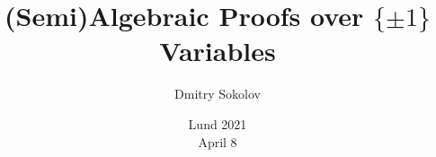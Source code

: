 

\titlegraphic{
    
}


\title[$\{\pm 1\}$ Variables]{
    (Semi)Algebraic Proofs over $\{\pm 1\}$ Variables
}

\author[Sokolov D.]{
    Dmitry Sokolov
}  


\date{Lund 2021\\ April 8}

\newcommand{\SPCR}{\PrSys{S}\text{-}\PrSys{PCR}}
\newcommand{\SSOS}{\PrSys{S}\text{-}\PrSys{SOS}}




    \maketitle

    
    
    
    

